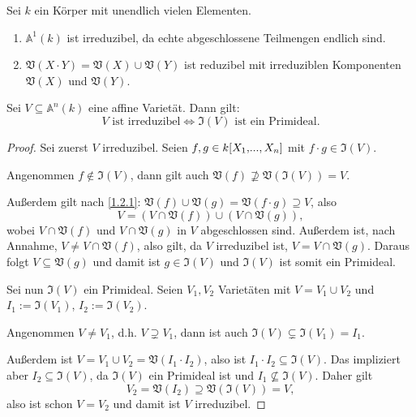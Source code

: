 \documentclass[a4paper,12pt,index=toc]{scrbook}
\theoremstyle{keinenummern} %
\def\A{\mathbb{A}}
\def\V{\mathfrak{V}}
\def\I{\mathfrak{I}}
\renewcommand{\dotsc}{\ensuremath{\!...}}
\newcommand{\polyx}[1][n]{\ensuremath%
  [X_{1},\dotsc,X_{#1}]}
\begin{document}
\begin{bsp}\label{1.2.8} Sei $k$ ein Körper mit unendlich vielen Elementen.
\begin{enumerate}
\item{} $\A^{1}(k)$ ist irreduzibel, da echte abgeschlossene Teilmengen endlich sind.
\item\label{1.2.8b} $\V(X\cdot Y) = \V(X)\cup\V(Y)$ ist reduzibel mit irreduziblen Komponenten $\V(X)$ und $\V(Y)$.
\end{enumerate}\end{bsp}

\begin{bem}\label{1.2.9}
Sei $V\subseteq\A^{n}(k)$ eine affine Varietät. Dann gilt:
\begin{equation*}V\text{ ist irreduzibel}\iff\I(V)\text{ ist ein Primideal}.\end{equation*}
\end{bem}
\begin{proof}
Sei zuerst $V$ irreduzibel. Seien $f,g\in k\polyx$ mit $f\cdot g\in\I(V)$. 

Angenommen $f\notin\I(V)$, dann gilt auch $\V(f)\not\supseteq\V(\I(V))=V$.

Außerdem gilt nach \cref{1.2.1}: $\V(f)\cup\V(g)=\V(f\cdot g)\supseteq V$, also
\begin{equation*}V=(V\cap \V(f))\cup(V\cap\V(g)),\end{equation*}
wobei $V\cap\V(f)$ und $V\cap\V(g)$ in $V$ abgeschlossen sind. Außerdem ist, nach Annahme, $V\neq V\cap\V(f)$, also gilt, da $V$ irreduzibel ist, $V=V\cap\V(g)$. Daraus folgt $V\subseteq\V(g)$ und damit ist $g\in\I(V)$ und $\I(V)$ ist somit ein Primideal.

Sei nun $\I(V)$ ein Primideal. Seien $V_{1},V_{2}$ Varietäten mit $V=V_{1}\cup V_{2}$ und $I_{1}:=\I(V_{1})$, $I_{2}:=\I(V_{2})$.

Angenommen $V\neq V_{1}$, d.h. $V\supsetneq V_{1}$, dann ist auch $\I(V)\subsetneq\I(V_{1})=I_{1}$.

Außerdem ist $V=V_{1}\cup V_{2}=\V(I_{1}\cdot I_{2})$, also ist $I_{1}\cdot I_{2}\subseteq\I(V)$. Das impliziert aber $I_{2}\subseteq\I(V)$, da $\I(V)$ ein Primideal ist und $I_{1}\not\subseteq\I(V)$. Daher gilt 
\begin{equation*}V_{2}=\V(I_{2})\supseteq\V(\I(V))=V,\end{equation*} 
also ist schon $V=V_{2}$ und damit ist $V$ irreduzibel.
\end{proof}
\end{document}
